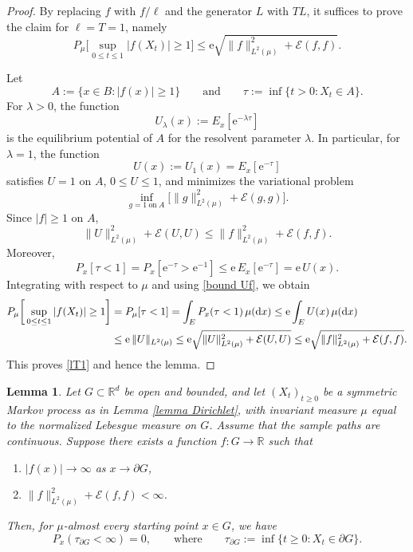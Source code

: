 \documentclass[11pt]{article}
\renewcommand{\d}{{\rm d}}
\newcommand{\e}{\mathrm e}
\newcommand{\R}{\mathbb R}
\newtheorem{lemma}[theorem]{Lemma}
\theoremstyle{rem}
\begin{document}
\begin{proof}
By replacing $f$ with $f/\ell$ and the generator $L$ with $TL$, it suffices to prove the claim for $\ell=T=1$, namely
\begin{equation}\label{lT1}
P_\mu\bigg[\sup_{0\leq t\leq 1}|f(X_t)|\geq 1\bigg]
\leq
\e\sqrt{\|f\|_{L^2(\mu)}^2+\mathcal E(f,f)}.
\end{equation}

Let
\[
A:=\{x\in B  : |f(x)|\geq 1\} \qquad\mbox{and}\qquad \tau:=\inf\{t>0:X_t\in A\}.
\]
For $\lambda>0$, the function
\[
U_\lambda(x):=E_x[\e^{-\lambda\tau}]
\]
is the equilibrium potential of $A$ for the resolvent parameter $\lambda$. In particular, for $\lambda=1$, the function
\[
U(x):=U_1(x)=E_x[\e^{-\tau}]
\]
satisfies $U=1$ on $A$, $0\leq U\leq1$, and minimizes the variational problem
\[
\inf_{g=1\ \mathrm{on}\ A}
\big[
\|g\|_{L^2(\mu)}^2+\mathcal E(g,g)
\big].
\]
Since $|f|\geq1$ on $A$, 
\begin{equation}\label{bound Uf}
\|U\|_{L^2(\mu)}^2+\mathcal E(U,U)
\leq
\|f\|_{L^2(\mu)}^2+\mathcal E(f,f).
\end{equation}
Moreover,
\[
P_x[\tau<1]
=
P_x[\e^{-\tau}>\e^{-1}]
\leq
\e\,E_x[\e^{-\tau}]
=
\e\,U(x).
\]
Integrating with respect to $\mu$ and using \eqref{bound Uf}, we obtain
\[
\begin{aligned}
P_\mu\bigg[\sup_{0\leq t\leq1}|f(X_t)|\geq1\bigg]
&=
P_\mu[\tau<1]
=
\int_E P_x(\tau<1)\,\mu(\d x)
\leq
\e\int_E U(x)\,\mu(\d x)
\\
&\leq
\e\,\|U\|_{L^2(\mu)}
\leq
\e\sqrt{\|U\|_{L^2(\mu)}^2+\mathcal E(U,U)}
\leq
\e\sqrt{\|f\|_{L^2(\mu)}^2+\mathcal E(f,f)}.
\end{aligned}
\]
This proves \eqref{lT1} and hence the lemma.
\end{proof}

\begin{lemma}\label{cor Dirichlet 1}
Let $G\subset\R^d$ be open and bounded, and let $(X_t)_{t\geq0}$ be a symmetric Markov process as in Lemma \ref{lemma Dirichlet}, with invariant measure $\mu$ equal to the normalized Lebesgue measure on $G$. Assume that the sample paths are continuous. Suppose there exists a function $f:G\to\R$ such that
\begin{enumerate}
\item $|f(x)|\to\infty$ as $x\to\partial G$,\label{1}
\item $\|f\|_{L^2(\mu)}^2+\mathcal E(f,f)<\infty$.\label{2}
\end{enumerate}
Then, for $\mu$-almost every starting point $x\in G$, we have 
\begin{equation}\label{claim est cor1}
P_x(\tau_{\partial G}<\infty)=0,
\qquad
\mbox{where}
\qquad
\tau_{\partial G}:=\inf\{t\geq0:X_t\in\partial G\}.
\end{equation}
\end{lemma}
\end{document}

